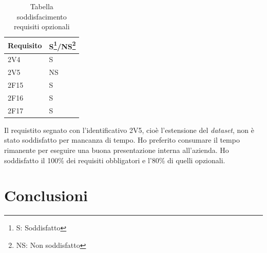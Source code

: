 \label{tab:pian1}
\begin{table}[!ht]
\begin{tabularx}{.35\textwidth}{XX}
\hline\hline
\textbf{Requisito} & \textbf{S\footnote{S: Soddisfatto}/NS\footnote{NS: Non soddisfatto}} \\
\hline
2V4 & S\\
\hline
2V5 & NS\\
\hline
2F15 & S\\
\hline
2F16 & S\\
\hline
2F17 & S\\
\hline
\end{tabularx}
 \captionsetup{singlelinecheck = false, format= hang, justification=raggedright}
\caption{Tabella soddisfacimento requisiti opzionali}
\end{table}%
Il requistito segnato con l'identificativo 2V5, cioè l'estensione del \textit{dataset}, non è stato soddisfatto per mancanza di tempo. Ho preferito consumare il tempo rimanente per eseguire una buona presentazione interna all'azienda. Ho soddisfatto il 100\% dei requisiti obbligatori e l'80\% di quelli opzionali.
\section{Conclusioni}
